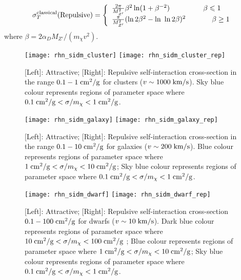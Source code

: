 \documentclass[prd,nofootinbib,preprint,superscriptaddress]{revtex4}
\begin{document}
		\begin{equation}
			\sigma^{\rm classical}_T (\rm Repulsive)=\left\{
			\begin{array}{l}
				
				\frac{2\pi}{M^2_{Z'}}\beta^2 \ln(1+\beta^{-2}) ~~~~~~~~~~~~~~\beta \leqslant 1\\
				\frac{\pi}{M^2_{Z'}}(\ln 2\beta^2 -\ln ~\ln 2\beta)^2 ~~~~~~~~~~~ \beta \geq 1\\
			\end{array}
			\right.
		\end{equation}   
		where $\beta = 2\alpha_D M_{Z'}/(m_\chi v^2)$.
		\begin{figure}[h!]
			\texttt{[image: rhn\_sidm\_cluster]}
			\hfil
			\texttt{[image: rhn\_sidm\_cluster\_rep]}
			\caption{[Left]: Attractive;  [Right]: Repulsive self-interaction cross-section in the range $0.1-1 \; {\rm cm}^2/{\rm g}$ for clusters ($v\sim1000 \; {\rm km/s}$). Sky blue colour  represents regions of parameter space where $0.1 \; {\rm cm}^2/{\rm g} < \sigma/m_\chi <1 \;{\rm cm}^2/{\rm g}$.}
			\label{sidm1}
		\end{figure}
		\begin{figure}[h!]	
			\texttt{[image: rhn\_sidm\_galaxy]}
			\hfil
			\texttt{[image: rhn\_sidm\_galaxy\_rep]}
			\caption{[Left]: Attractive;  [Right]: Repulsive self-interaction cross-section in the range  $0.1-10 \; {\rm cm}^2/{\rm g}$ for galaxies ($v\sim200 \; {\rm km/s}$). Blue colour represents regions of parameter space where $1 \; {\rm cm}^2/{\rm g} < \sigma/m_\chi <10 \; {\rm cm}^2/{\rm g}$; Sky blue colour  represents regions of parameter space where $0.1 \; {\rm cm}^2/{\rm g} < \sigma/m_\chi <1 \;{\rm cm}^2/{\rm g}$.}
			\label{sidm2}
		\end{figure}
		\begin{figure}[h!]	
			\texttt{[image: rhn\_sidm\_dwarf]}
			\hfil
			\texttt{[image: rhn\_sidm\_dwarf\_rep]}
			\caption{[Left]: Attractive;  [Right]: Repulsive self-interaction cross-section $0.1-100 \; {\rm cm}^2/{\rm g}$ for dwarfs ($v\sim10 \; {\rm km/s}$). Dark blue colour represents regions of parameter space where $10 \; {\rm cm}^2/{\rm g} < \sigma/m_\chi < 100 \; {\rm cm}^2/{\rm g}$ ;  Blue colour represents regions of parameter space where $1 \; {\rm cm}^2/{\rm g} < \sigma/m_\chi <10 \; {\rm cm}^2/{\rm g}$; Sky blue colour  represents regions of parameter space where $0.1 \; {\rm cm}^2/{\rm g} < \sigma/m_\chi <1 \;{\rm cm}^2/{\rm g}$.}
			\label{sidm3}
		\end{figure}
		
\end{document}
